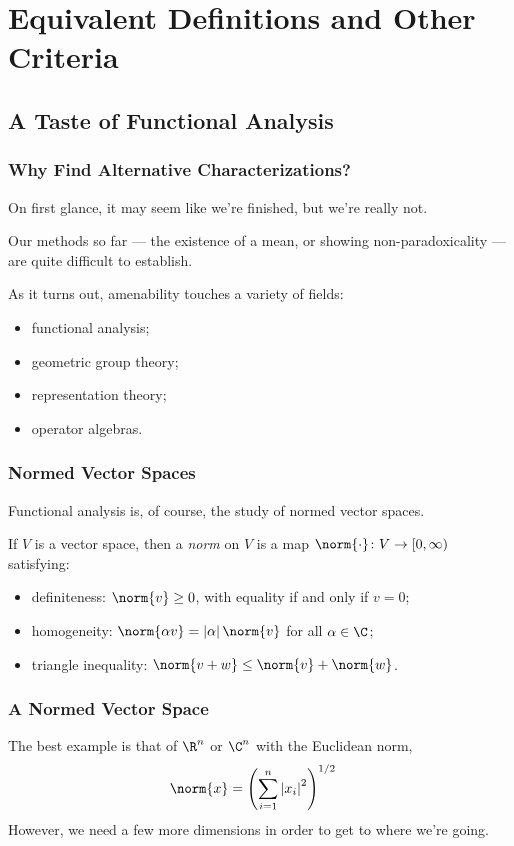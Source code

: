 \documentclass{beamer-custom}
\begin{document}
\section{Equivalent Definitions and Other Criteria}%
\subsection{A Taste of Functional Analysis}%
\begin{frame}
  \frametitle{Why Find Alternative Characterizations?}
  On first glance, it may seem like we're finished, but we're really not.\pause\newline

  Our methods so far --- the existence of a mean, or showing non-paradoxicality --- are quite difficult to establish.\pause\newline

  As it turns out, amenability touches a variety of fields:
  \begin{itemize}
    \item functional analysis;
    \item geometric group theory;
    \item representation theory;
    \item operator algebras.
  \end{itemize}
\end{frame}
\begin{frame}
  \frametitle{Normed Vector Spaces}
  Functional analysis is, of course, the study of normed vector spaces.\pause\newline

  If $V$ is a vector space, then a \textit{norm} on $V$ is a map $\norm{\cdot}\colon V\rightarrow [0,\infty)$ satisfying:\pause
  \begin{itemize}
    \item definiteness: $\norm{v} \geq 0$, with equality if and only if $v = 0$;\pause
    \item homogeneity: $\norm{\alpha v} = \left\vert \alpha \right\vert\norm{v}$ for all $\alpha\in \C$;\pause
    \item triangle inequality: $\norm{v + w}\leq \norm{v} + \norm{w}$.
  \end{itemize}
\end{frame}
\begin{frame}
  \frametitle{A Normed Vector Space}
  The best example is that of $\R^n$ or $\C^n$ with the Euclidean norm,
  \begin{align*}
    \norm{x} &= \left( \sum_{i=1}^{n}\left\vert x_i \right\vert^2 \right)^{1/2}
  \end{align*}\pause
  However, we need a few more dimensions in order to get to where we're going.
\end{frame}
\end{document}
